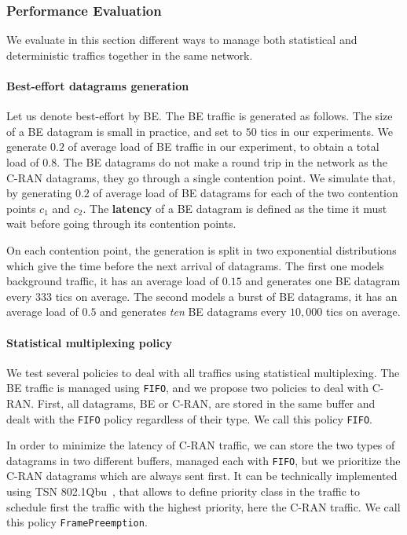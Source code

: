 \documentclass[a4paper,10pt]{journal}
\newcommand\FIFO{\texttt{FIFO}\xspace}
\newcommand\framepre{\texttt{FramePreemption}\xspace}
\begin{document}
    \subsubsection{Performance Evaluation}
    
    We evaluate in this section different ways to manage both statistical and deterministic traffics together in the same network.
 
    \paragraph{Best-effort datagrams generation}
   Let us denote best-effort by BE. The BE traffic is generated as follows. The size of a BE datagram is small in practice, and set to $50$ tics in our experiments. We generate $0.2$ of average load of BE traffic in our experiment, to obtain a total load of $0.8$. The BE datagrams do not make a round trip in the network as the C-RAN datagrams, they go through a single contention point. 
    We simulate that, by generating $0.2$ of average load of BE datagrams for each of the two contention points $c_1$ and $c_2$. The \textbf{latency} of a BE datagram is defined as the time it must wait before going
    through its contention points.

    On each contention point, the generation is split in two exponential distributions which give the time before the next arrival of datagrams. The first one models background traffic, it has an average load of $0.15$ and generates one BE datagram every $333$ tics on average. The second models a burst of BE datagrams, it has an average load of $0.5$ and generates \emph{ten} BE datagrams every $10,000$ tics on average. 
    
   	\paragraph{Statistical multiplexing policy}

   We test several policies to deal with all traffics using statistical multiplexing.
   	The BE traffic is managed using \FIFO, and we propose two policies to deal with C-RAN. First, all datagrams, BE or C-RAN, are stored in the same buffer and dealt with the \FIFO policy regardless of their type. We call this policy \FIFO.

    In order to minimize the latency of C-RAN traffic, we can store the two types of datagrams in two different buffers, managed each with \FIFO, but we prioritize the C-RAN datagrams which are always sent first. It can be technically implemented using TSN 802.1Qbu~\cite{ieee802}, that allows to define priority class in the traffic to schedule first the traffic with the highest priority, here the C-RAN traffic. We call this policy \framepre.
   
\end{document}
